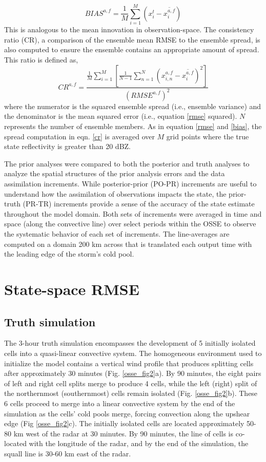 \begin{equation}
   BIAS^{a,f} = \frac{1}{M}\sum_{i=1}^{M} (x_i^t - \overline{x_i^{a,f}})
\label{bias}
\end{equation}
This is analogous to the mean innovation in observation-space. The consistency ratio (CR), a comparison of the ensemble mean RMSE to the ensemble spread, is also computed to ensure the ensemble contains an appropriate amount of spread. This ratio is defined as,
\begin{equation}
   CR^{a,f} = \frac{\frac{1}{M}\sum_{i=1}^{M} [\frac{1}{N-1}\sum_{n=1}^{N}(x_{i,n}^{a,f} - \overline{x_i^{a,f}})^2]}{(RMSE^{a,f})^2}
\label{cr}
\end{equation}
where the numerator is the squared ensemble spread (i.e., ensemble variance) and the denominator is the mean squared error (i.e., equation \ref{rmse} squared). \(N\) represents the number of ensemble members. As in equation \ref{rmse} and \ref{bias}, the spread computation in eqn. \ref{cr} is averaged over \(M\) grid points where the true state reflectivity is greater than 20 dBZ.

The prior analyses were compared to both the posterior and truth analyses to analyze the spatial structures of the prior analysis errors and the data assimilation increments. While posterior-prior (PO-PR) increments are useful to understand how the assimilation of observations impacts the state, the prior-truth (PR-TR) increments provide a sense of the accuracy of the state estimate throughout the model domain. Both sets of increments were averaged in time and space (along the convective line) over select periods within the OSSE to observe the systematic behavior of each set of increments. The line-averages are computed on a domain 200 km across that is translated each output time with the leading edge of the storm’s cold pool.

\section{State-space RMSE}
\subsection{Truth simulation}
The 3-hour truth simulation encompasses the development of 5 initially isolated cells into a quasi-linear convective system. The homogeneous environment used to initialize the model contains a vertical wind profile that produces splitting cells after approximately 30 minutes (Fig. \ref{osse_fig2}a). By 90 minutes, the eight pairs of left and right cell splits merge to produce 4 cells, while the left (right) split of the northernmost (southernmost) cells remain isolated (Fig. \ref{osse_fig2}b). These 6 cells proceed to merge into a linear convective system by the end of the simulation as the cells’ cold pools merge, forcing convection along the upshear edge (Fig \ref{osse_fig2}c). The initially isolated cells are located approximately 50-80 km west of the radar at 30 minutes. By 90 minutes, the line of cells is co-located with the longitude of the radar, and by the end of the simulation, the squall line is 30-60 km east of the radar.

